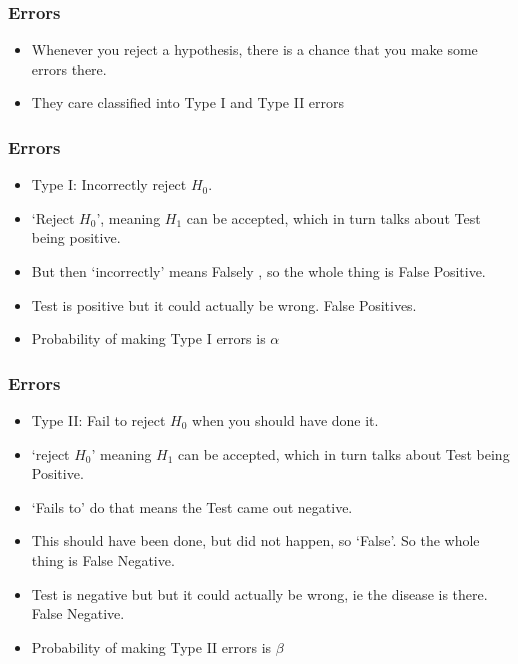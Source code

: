\begin{frame}[fragile]\frametitle{Errors}
\begin{itemize}
\item Whenever you reject a hypothesis, there is a chance that you make some errors there.
\item They care classified into Type I and Type II errors
\end{itemize}
\end{frame}

\begin{frame}[fragile]\frametitle{Errors}
\begin{itemize}
\item Type I: Incorrectly reject $H_0$. 
\item `Reject $H_0$', meaning $H_1$ can be accepted, which in turn talks about Test being positive.
\item But then `incorrectly' means Falsely , so the whole thing is False Positive.
\item Test is positive but it could actually be wrong. False Positives.
\item Probability of making Type I errors is $\alpha$
\end{itemize}
\end{frame}

\begin{frame}[fragile]\frametitle{Errors}
\begin{itemize}
\item Type II: Fail to reject $H_0$ when you should have done it. 
\item `reject $H_0$' meaning $H_1$ can be accepted, which in turn talks about Test being Positive.
\item `Fails to' do that means the Test came out negative. 
\item This should have been done, but did not happen, so `False'. So the whole thing is False Negative.
\item Test is negative but but it could actually be wrong, ie the disease is there. False Negative.
\item Probability of making Type II errors is $\beta$
\end{itemize}
\end{frame}


